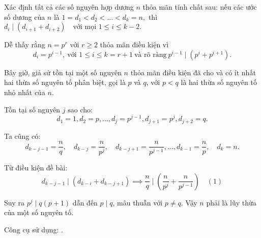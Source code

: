 \documentclass[../../divisors.tex]{subfiles}
\begin{document}
\begin{example*}
    \label{example:IMO-2023-P1}
    Xác định tất cả các số nguyên hợp dương \( n \) thỏa mãn tính chất sau: nếu các ước số dương của \( n \) là $1 = d_1 < d_2 < \dots < d_k = n,$
    thì $d_i \mid (d_{i+1} + d_{i+2}) \quad \text{với mọi } 1 \leq i \leq k - 2.$
\end{example*}

\begin{soln}[1\footnotemark]
    Dễ thấy rằng \( n = p^r \) với \( r \geq 2 \) thỏa mãn điều kiện vì 
    \[
        d_i = p^{i-1},\ \text{với } 1 \leq i \leq k = r+1\ \text{và rõ ràng}\ p^{i-1} \mid (p^i + p^{i+1}).
    \]
    
    Bây giờ, giả sử tồn tại một số nguyên \( n \) thỏa mãn điều kiện đã cho và có ít nhất hai thừa số nguyên tố phân biệt,
    gọi là \( p \) và \( q \), với \( p < q \) là hai thừa số nguyên tố nhỏ nhất của \( n \).
    
    Tồn tại số nguyên \( j \) sao cho:
    \[
        d_1 = 1, d_2 = p, \dots, d_j = p^{j-1}, d_{j+1} = p^j, d_{j+2} = q.
    \]
    
    Ta cũng có:
    \[
        d_{k-j-1} = \frac{n}{q}, \quad d_{k-j} = \frac{n}{p^j}, \quad d_{k-j+1} = \frac{n}{p^{j-1}}, \dots, d_{k-1} = \frac{n}{p}, \quad d_k = n.
    \]
    
    Từ điều kiện đề bài:
    \[
        d_{k-j-1} \mid (d_{k-i} + d_{k-j+1}) \implies \frac{n}{q} \mid \left( \frac{n}{p^j} + \frac{n}{p^{j-1}} \right)  \quad (1)
    \]
    
    Suy ra $p^j \mid q(p+1)$ dẫn đến $p \mid q$, mâu thuẫn với $p \neq q$. Vậy \( n \) phải là lũy thừa của một số nguyên tố.
\end{soln}

\begin{remark*}
    Công cụ sử dụng: .
\end{remark*}
\end{document}
